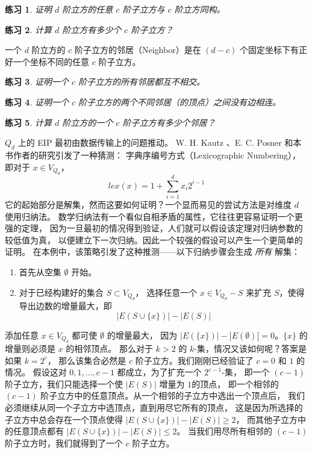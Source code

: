 \documentclass[12pt, a4paper]{article}
\newtheorem{exercise}{练习}
\begin{document}
\begin{exercise}
\label{Exercise 3}
证明 $d$ 阶立方的任意 $c$ 阶子立方与 $c$ 阶立方同构。
\end{exercise}

\begin{exercise}
\label{Exercise 4}
计算 $d$ 阶立方有多少个 $c$ 阶子立方？
\end{exercise}

一个 $d$ 阶立方的 $c$ 阶子立方的邻居（Neighbor）是在 $(d − c)$
个固定坐标下有正好一个坐标不同的任意 $c$ 阶子立方。

\begin{exercise}
\label{Exercise 5}
证明一个 $c$ 阶子立方的所有邻居都互不相交。
\end{exercise}

\begin{exercise}
\label{Exercise 6}
证明一个 $c$ 阶子立方的两个不同邻居（的顶点）之间没有边相连。
\end{exercise}

\begin{exercise}
\label{Exercise 7}
计算 $d$ 阶立方的一个 $c$ 阶子立方有多少个邻居？
\end{exercise}

$Q_d$ 上的 EIP 最初由数据传输上的问题推动。
W. H. Kautz \cite{Kautz.1954}、E. C. Posner 和本书作者的研究引发了一种猜测：
字典序编号方式（Lexicographic Numbering），即对于 $x \in V_{Q_d}$，
\begin{equation*}
lex(x) = 1 + \sum_{i = 1}^d x_i 2^{i - 1}
\end{equation*}
它的起始部分是解集，然而这要如何证明？一个显而易见的尝试方法是对维度 $d$ 使用归纳法。
数学归纳法有一个看似自相矛盾的属性，它往往更容易证明一个更强的定理，
因为一旦最初的情况得到验证，人们就可以假设该定理对归纳参数的较低值为真，
以便建立下一次归纳。因此一个较强的假设可以产生一个更简单的证明。
在本例中，该策略引发了这种推测——以下归纳步骤会生成 \emph{所有} 解集：

\begin{enumerate}[(1)]
	\item 首先从空集 $\emptyset$ 开始。
	\item 对于已经构建好的集合 $S \subset V_{Q_d}$，
		选择任意一个 $x \in V_{Q_d} − S$ 来扩充 $S$，使得导出边数的增量最大，即
		\begin{equation*}
		|E(S \cup \{x\})| − |E(S)|
		\end{equation*}
\end{enumerate}

添加任意 $x \in V_{Q_d}$ 都可使 $\emptyset$ 的增量最大，
因为 $|E(\{x\})| − |E(\emptyset)| = 0$。$\{x\}$ 的增量则必须是 $x$ 的相邻顶点。
那么对于 $k > 2$ 的 $k$-集，情况又该如何呢？答案是如果 $k = 2^c$，
那么该集合必然是 $c$ 阶子立方。我们刚刚已经验证了 $c = 0$ 和 $1$ 的情况。
假设这对 $0, 1, \dots, c − 1$ 都成立，为了扩充一个 $2^{c − 1}$-集，
即一个 $(c − 1)$ 阶子立方，我们只能选择一个使 $|E(S)|$ 增量为 $1 $的顶点，
即一个相邻的 $(c − 1)$ 阶子立方中的任意顶点。从一个相邻的子立方中选出一个顶点后，
我们必须继续从同一个子立方中选顶点，直到用尽它所有的顶点，
这是因为所选择的子立方中总会存在一个顶点使得 $|E(S \cup \{x\})| − |E(S)| \ge 2$，
而其他子立方中的任意顶点都有 $|E(S \cup \{x\})| − |E(S)| \le 2$。
当我们用尽所有相邻的 $(c − 1)$ 阶子立方时，我们就得到了一个 $c$ 阶子立方。
\end{document}
